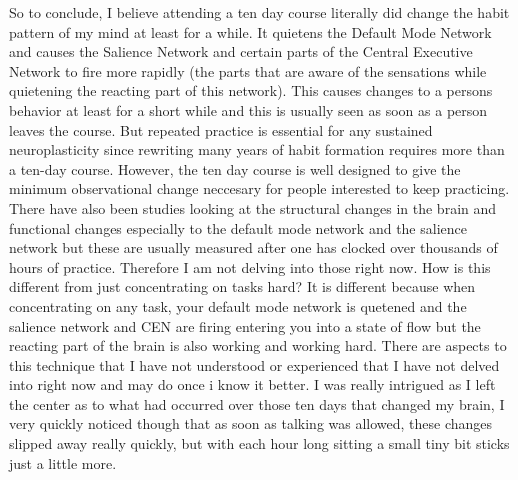 \documentclass[twocolumn]{article}
\begin{document}
So to conclude, I believe attending a ten day course literally did change the habit pattern of my mind at least for a while.
It quietens the Default Mode Network and causes the Salience Network and certain parts of the Central Executive Network to fire more rapidly (the parts that are aware of the sensations while quietening the reacting part of this network). This causes changes to a persons behavior at least for a short while and this is usually seen as soon as a person leaves the course. But repeated practice is essential for any sustained neuroplasticity since rewriting many years of habit formation requires more than a ten-day course. However, the ten day course is well designed to give the minimum observational change neccesary for people interested to keep practicing.
There have also been studies looking at the structural changes in the brain and functional changes especially to the default mode network and the salience network but these are usually measured after one has clocked over thousands of hours of practice. Therefore I am not delving into those right now.
How is this different from just concentrating on tasks hard? It is different because when concentrating on any task, your default mode network is quetened and the salience network and CEN are firing entering you into a state of flow but the reacting part of the brain is also working and working hard.
There are aspects to this technique that I have not understood or experienced that I have not delved into right now and may do once i know it better.
I was really intrigued as I left the center as to what had occurred over those ten days that changed my brain, I very quickly noticed though that as soon as talking was allowed, these changes slipped away really quickly, but with each hour long sitting a small tiny bit sticks just a little more.


\pagebreak
\end{document}
